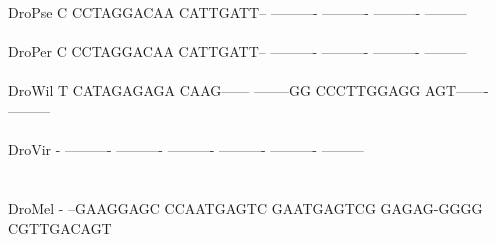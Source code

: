 \documentclass[11pt,twoside,reqno,a4paper]{article}
\begin{document}
{DroPse	C	CCTAGGACAA	CATTGATT--	----------	----------	----------	---------\\
\hspace*{7\charwidth}\hspace*{1\charwidth}\hspace*{1\charwidth}\hspace*{1\charwidth}\hspace*{1\charwidth}\hspace*{1\charwidth}\hspace*{1\charwidth}\\
DroPer	C	CCTAGGACAA	CATTGATT--	----------	----------	----------	---------\\
\hspace*{7\charwidth}\hspace*{1\charwidth}\hspace*{1\charwidth}\hspace*{1\charwidth}\hspace*{1\charwidth}\hspace*{1\charwidth}\hspace*{1\charwidth}\\
DroWil	T	CATAGAGAGA	CAAG------	--------GG	CCCTTGGAGG	AGT-------	---------\\
\hspace*{7\charwidth}\hspace*{1\charwidth}\hspace*{1\charwidth}\hspace*{1\charwidth}\hspace*{1\charwidth}\hspace*{1\charwidth}\hspace*{1\charwidth}\\
DroVir	-	----------	----------	----------	----------	----------	---------\\
\hspace*{7\charwidth}\hspace*{1\charwidth}\hspace*{1\charwidth}\hspace*{1\charwidth}\hspace*{1\charwidth}\hspace*{1\charwidth}\hspace*{1\charwidth}\\
\\
DroMel	-	--GAAGGAGC	CCAATGAGTC	GAATGAGTCG	GAGAG-GGGG	CGTTGACAGT	\\
\hspace*{7\charwidth}\hspace*{1\charwidth}\hspace*{1\charwidth}\hspace*{1\charwidth}\hspace*{1\charwidth}\hspace*{1\charwidth}\hspace*{1\charwidth}\\
}
\end{document}
